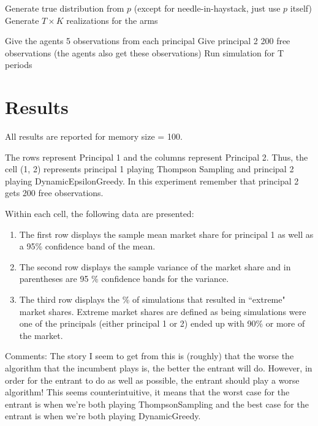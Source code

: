 \documentclass[11pt,letterpaper]{article}
\begin{document}
\begin{algorithm}
\begin{algorithmic}[1]
\State Generate true distribution from $p$ (except for needle-in-haystack, just use $p$ itself)
\State Generate $T \times K$ realizations for the arms 
				
				\State Give the agents 5 observations from each principal
				\State Give principal 2 200 free observations (the agents also get these observations)
				\State Run simulation for T periods
			\EndFor
		\EndFor
	\EndFor
\EndFor
\end{algorithmic}
\end{algorithm}

\section*{Results}
All results are reported for memory size = 100. \\
\vspace{0.25cm}

The rows represent Principal 1 and the columns represent Principal 2. Thus, the cell (1, 2) represents principal 1 playing Thompson Sampling and principal 2 playing DynamicEpsilonGreedy. In this experiment remember that principal 2 gets 200 free observations.  \\
\vspace{0.1cm}

Within each cell, the following data are presented: \\

\begin{enumerate}
\item The first row displays the sample mean market share for principal 1 as well as a 95\% confidence band of the mean.

\item The second row displays the sample variance of the market share and in parentheses are 95 \% confidence bands for the variance.

\item The third row displays the \% of simulations that resulted in ``extreme" market shares. Extreme market shares are defined as being simulations were one of the principals (either principal 1 or 2) ended up with 90\% or more of the market.
\end{enumerate}


Comments: The story I seem to get from this is (roughly) that the worse the algorithm that the incumbent plays is, the better the entrant will do. However, in order for the entrant to do as well as possible, the entrant should play a worse algorithm! This seems counterintuitive, it means that the worst case for the entrant is when we're both playing ThompsonSampling and the best case for the entrant is when we're both playing DynamicGreedy.
\end{document}
